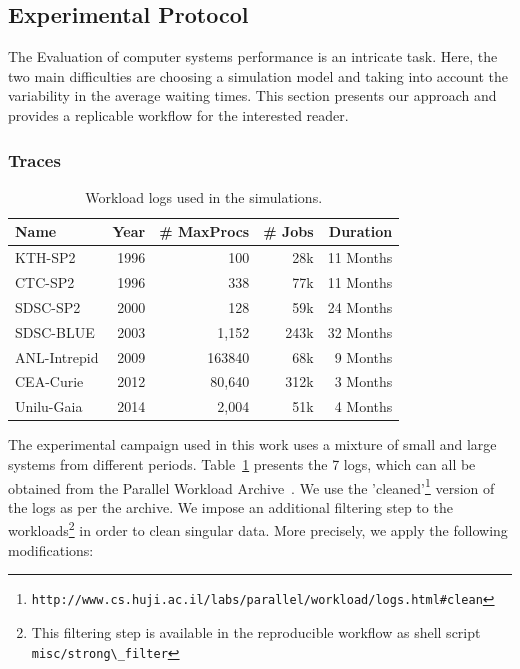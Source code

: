 \documentclass[sigconf]{acmart}
\newcommand{\ra}[1]{\renewcommand{\arraystretch}{#1}}
\begin{document}
\subsection{Experimental Protocol}
\label{sub:protocol}

The Evaluation of computer systems performance is an intricate
task\cite{feitbook}. Here, the two main difficulties are choosing a simulation
model and taking into account the variability in the average waiting times.
This section presents our approach and provides a replicable workflow
for the interested reader.

\subsubsection{Traces}
\label{sub:traces}

\begin{table}[ht]
  \centering
  \ra{1.3}
  \caption{Workload logs used in the simulations.}
  \label{tab:logs}
  \begin{tabular}{@{}lrrrr@{}}
    \hline
    Name          & Year & \# MaxProcs & \# Jobs & Duration\\
    \hline
    KTH-SP2       & 1996 & 100         & 28k     & 11 Months\\
    CTC-SP2       & 1996 & 338         & 77k     & 11 Months\\
    SDSC-SP2      & 2000 & 128         & 59k     & 24 Months\\
    SDSC-BLUE     & 2003 & 1,152       & 243k    & 32 Months\\
    ANL-Intrepid  & 2009 & 163840      & 68k     & 9  Months\\
    CEA-Curie     & 2012 & 80,640      & 312k    & 3  Months\\
    Unilu-Gaia    & 2014 & 2,004        & 51k     & 4  Months\\
    \hline
  \end{tabular}
\end{table}

The experimental campaign used in this work uses a mixture of small and large
systems from different periods. Table~\ref{tab:logs} presents the 7 logs, which
can all be obtained from the Parallel Workload
Archive~\cite{Feitelson20142967}. We use the 'cleaned'\footnote{\lstinline[basicstyle=\ttfamily\color{blue}]|http://www.cs.huji.ac.il/labs/parallel/workload/logs.html#clean|} version of the logs as
per the archive. We impose an additional
filtering step to the workloads\footnote{This filtering step is available in
the reproducible workflow\cite{repro} as shell script
\lstinline[basicstyle=\ttfamily\color{blue}]|misc/strong\_filter|} in order to
clean singular data. More precisely, we apply the following modifications:
\end{document}
